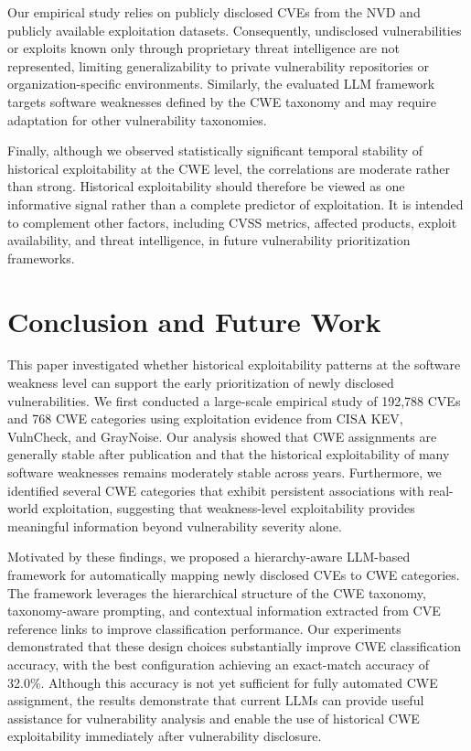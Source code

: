 \documentclass[conference,compsoc]{IEEEtran}
\begin{document}
Our empirical study relies on publicly disclosed CVEs from the NVD and publicly available exploitation datasets. Consequently, undisclosed vulnerabilities or exploits known only through proprietary threat intelligence are not represented, limiting generalizability to private vulnerability repositories or organization-specific environments. Similarly, the evaluated LLM framework targets software weaknesses defined by the CWE taxonomy and may require adaptation for other vulnerability taxonomies.

Finally, although we observed statistically significant temporal stability of historical exploitability at the CWE level, the correlations are moderate rather than strong. Historical exploitability should therefore be viewed as one informative signal rather than a complete predictor of exploitation. It is intended to complement other factors, including CVSS metrics, affected products, exploit availability, and threat intelligence, in future vulnerability prioritization frameworks.

\section{Conclusion and Future Work}

This paper investigated whether historical exploitability patterns at the software weakness level can support the early prioritization of newly disclosed vulnerabilities. We first conducted a large-scale empirical study of 192,788 CVEs and 768 CWE categories using exploitation evidence from CISA KEV, VulnCheck, and GrayNoise. Our analysis showed that CWE assignments are generally stable after publication and that the historical exploitability of many software weaknesses remains moderately stable across years. Furthermore, we identified several CWE categories that exhibit persistent associations with real-world exploitation, suggesting that weakness-level exploitability provides meaningful information beyond vulnerability severity alone.

Motivated by these findings, we proposed a hierarchy-aware LLM-based framework for automatically mapping newly disclosed CVEs to CWE categories. The framework leverages the hierarchical structure of the CWE taxonomy, taxonomy-aware prompting, and contextual information extracted from CVE reference links to improve classification performance. Our experiments demonstrated that these design choices substantially improve CWE classification accuracy, with the best configuration achieving an exact-match accuracy of 32.0\%. Although this accuracy is not yet sufficient for fully automated CWE assignment, the results demonstrate that current LLMs can provide useful assistance for vulnerability analysis and enable the use of historical CWE exploitability immediately after vulnerability disclosure.
\end{document}
